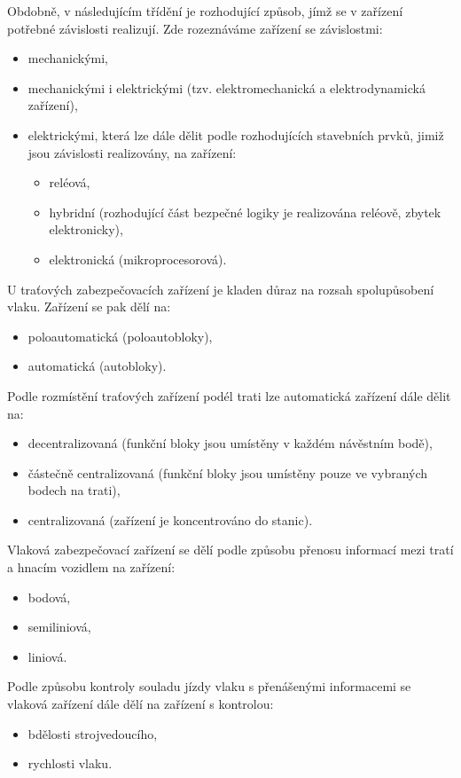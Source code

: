 {  Obdobně, v následujícím třídění je rozhodující způsob, jímž se v zařízení potřebné závislosti
  realizují. Zde rozeznáváme zařízení se závislostmi:
  \begin{itemize}
    \item mechanickými,
    \item mechanickými i elektrickými (tzv. elektromechanická a elektrodynamická zařízení),
    \item elektrickými, která lze dále dělit podle rozhodujících stavebních prvků, jimiž jsou 
         závislosti realizovány, na zařízení:
       \begin{itemize}
       \item reléová,
       \item hybridní (rozhodující část bezpečné logiky je realizována reléově, zbytek 
             elektronicky),
       \item elektronická (mikroprocesorová). 
       \end{itemize}
  \end{itemize}

  U traťových zabezpečovacích zařízení je kladen důraz na rozsah spolupůsobení vlaku. Zařízení se
  pak dělí na:
  \begin{itemize}
    \item poloautomatická (poloautobloky),
    \item automatická (autobloky).
  \end{itemize}
  Podle rozmístění traťových zařízení podél trati lze automatická zařízení dále dělit na:
  \begin{itemize}
    \item decentralizovaná (funkční bloky jsou umístěny v každém návěstním bodě),
    \item částečně centralizovaná (funkční bloky jsou umístěny pouze ve vybraných bodech na trati),
    \item centralizovaná (zařízení je koncentrováno do stanic).
  \end{itemize}
  Vlaková zabezpečovací zařízení se dělí podle způsobu přenosu informací mezi tratí a hnacím
  vozidlem na zařízení:
  \begin{itemize}
    \item bodová,
    \item semiliniová,
    \item liniová. 
  \end{itemize}

  Podle způsobu kontroly souladu jízdy vlaku s přenášenými informacemi se vlaková zařízení dále 
  dělí na zařízení s kontrolou:
  \begin{itemize}
    \item bdělosti strojvedoucího,
    \item rychlosti vlaku.
  \end{itemize}
  
}
